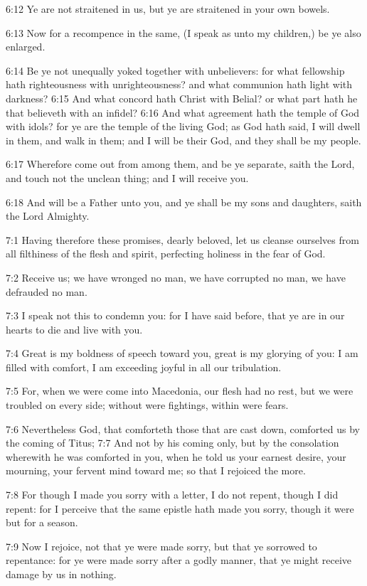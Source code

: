6:12 Ye are not straitened in us, but ye are straitened in your own bowels.

6:13 Now for a recompence in the same, (I speak as unto my children,) be ye also enlarged.

6:14 Be ye not unequally yoked together with unbelievers: for what fellowship hath righteousness with unrighteousness? and what communion hath light with darkness?  6:15 And what concord hath Christ with Belial? or what part hath he that believeth with an infidel?  6:16 And what agreement hath the temple of God with idols? for ye are the temple of the living God; as God hath said, I will dwell in them, and walk in them; and I will be their God, and they shall be my people.

6:17 Wherefore come out from among them, and be ye separate, saith the Lord, and touch not the unclean thing; and I will receive you.

6:18 And will be a Father unto you, and ye shall be my sons and daughters, saith the Lord Almighty.

7:1 Having therefore these promises, dearly beloved, let us cleanse ourselves from all filthiness of the flesh and spirit, perfecting holiness in the fear of God.

7:2 Receive us; we have wronged no man, we have corrupted no man, we have defrauded no man.

7:3 I speak not this to condemn you: for I have said before, that ye are in our hearts to die and live with you.

7:4 Great is my boldness of speech toward you, great is my glorying of you: I am filled with comfort, I am exceeding joyful in all our tribulation.

7:5 For, when we were come into Macedonia, our flesh had no rest, but we were troubled on every side; without were fightings, within were fears.

7:6 Nevertheless God, that comforteth those that are cast down, comforted us by the coming of Titus; 7:7 And not by his coming only, but by the consolation wherewith he was comforted in you, when he told us your earnest desire, your mourning, your fervent mind toward me; so that I rejoiced the more.

7:8 For though I made you sorry with a letter, I do not repent, though I did repent: for I perceive that the same epistle hath made you sorry, though it were but for a season.

7:9 Now I rejoice, not that ye were made sorry, but that ye sorrowed to repentance: for ye were made sorry after a godly manner, that ye might receive damage by us in nothing.

